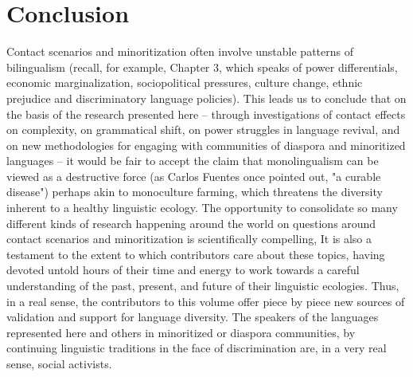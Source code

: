 \documentclass[output=paper]{langscibook}
\begin{document}
\section{Conclusion}
Contact scenarios and minoritization often involve unstable patterns of bilingualism (recall, for example, Chapter 3, which speaks of power differentials, economic marginalization, sociopolitical pressures, culture change, ethnic prejudice and discriminatory language policies). This leads us to  conclude that on the basis of the research presented here -- through investigations of contact effects on complexity, on grammatical shift, on power struggles in language revival, and on new methodologies for engaging with communities of diaspora and minoritized languages -- it would be fair to accept the claim that monolingualism can be viewed as a destructive force (as Carlos Fuentes once pointed out, "a curable disease") perhaps akin to monoculture farming, which threatens the diversity inherent to a healthy linguistic ecology. 
The opportunity to consolidate so many different kinds of research happening around the world on questions around contact scenarios and minoritization is scientifically compelling, It is also a testament to the extent to which contributors care  about these topics, having devoted untold hours of their time and energy to work towards a careful understanding of the past, present, and future of their linguistic ecologies. Thus, in a real sense, the contributors to this volume offer piece by piece new sources of validation and support for language diversity. The speakers of the languages represented here and others in minoritized or diaspora communities, by  continuing linguistic traditions in the face of discrimination are, in a very real sense, social activists.%



\sloppy
\printbibliography[heading=subbibliography,notkeyword=this]
\end{document}
